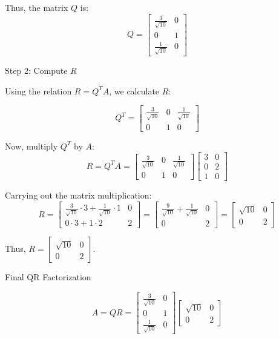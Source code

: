 \documentclass[11pt]{article}
\begin{document}
Thus, the matrix \( Q \) is:
\[
Q = \begin{bmatrix}
\frac{3}{\sqrt{10}} & 0 \\
0 & 1 \\
\frac{1}{\sqrt{10}} & 0
\end{bmatrix}
\]

Step 2: Compute \(R\)

Using the relation \( R = Q^T A \), we calculate \( R \):

\[
Q^T = \begin{bmatrix}
\frac{3}{\sqrt{10}} & 0 & \frac{1}{\sqrt{10}} \\
0 & 1 & 0
\end{bmatrix}
\]

Now, multiply \( Q^T \) by \( A \):
\[
R = Q^T A = \begin{bmatrix}
\frac{3}{\sqrt{10}} & 0 & \frac{1}{\sqrt{10}} \\
0 & 1 & 0
\end{bmatrix} \begin{bmatrix}
3 & 0 \\
0 & 2 \\
1 & 0
\end{bmatrix}
\]

Carrying out the matrix multiplication:
\[
R = \begin{bmatrix}
\frac{3}{\sqrt{10}} \cdot 3 + \frac{1}{\sqrt{10}} \cdot 1 & 0 \\
0 \cdot 3 + 1 \cdot 2 & 2
\end{bmatrix}
= \begin{bmatrix}
\frac{9}{\sqrt{10}} + \frac{1}{\sqrt{10}} & 0 \\
0 & 2
\end{bmatrix}
= \begin{bmatrix}
\sqrt{10} & 0 \\
0 & 2
\end{bmatrix}
\]

Thus, \( R = \begin{bmatrix}
\sqrt{10} & 0 \\
0 & 2
\end{bmatrix} \).

Final QR Factorization

\[
\boxed{A = QR = 
\begin{bmatrix}
\frac{3}{\sqrt{10}} & 0 \\
0 & 1 \\
\frac{1}{\sqrt{10}} & 0
\end{bmatrix} \begin{bmatrix}
\sqrt{10} & 0 \\
0 & 2
\end{bmatrix}
}
\]
\end{document}
